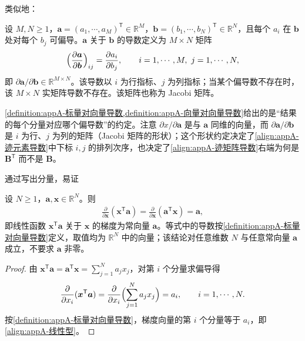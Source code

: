\documentclass[../main.tex]{subfiles}
\begin{document}
类似地：
\begin{definition}[向量关于向量的导数]\label{definition:appA-向量对向量导数}
设 $M,N\geqslant1$，$\bm{a}=(a_1,\cdots,a_M)^{\mathsf{T}}\in\mathbb{R}^{M}$，$\bm{b}=(b_1,\cdots,b_N)^{\mathsf{T}}\in\mathbb{R}^{N}$，且每个 $a_i$ 在 $\bm{b}$ 处对每个 $b_j$ 可偏导。$\bm{a}$ 关于 $\bm{b}$ 的导数定义为 $M\times N$ 矩阵
\begin{align}
  \Bigl(\frac{\partial\bm{a}}{\partial\bm{b}}\Bigr)_{ij}=\frac{\partial a_i}{\partial b_j},\qquad i=1,\cdots,M,\ j=1,\cdots,N,
  \label{align:appA-向量对向量导数}
\end{align}
即 $\partial\bm{a}/\partial\bm{b}\in\mathbb{R}^{M\times N}$。该导数以 $i$ 为行指标、$j$ 为列指标；当某个偏导数不存在时，该 $M\times N$ 实矩阵导数不存在。该矩阵也称为 Jacobi 矩阵。
\end{definition}

\begin{remark}
\cref{definition:appA-标量对向量导数,definition:appA-向量对向量导数}给出的是“结果的每个分量对应哪个偏导数”的约定。注意 $\partial x/\partial\bm{a}$ 是与 $\bm{a}$ 同维的向量，而 $\partial\bm{a}/\partial\bm{b}$ 是 $i$ 为行、$j$ 为列的矩阵（Jacobi 矩阵的形状）；这个形状约定决定了\eqref{align:appA-迹元素导数}中下标 $i,j$ 的排列次序，也决定了\eqref{align:appA-迹矩阵导数}右端为何是 $\bm{B}^{\mathsf{T}}$ 而不是 $\bm{B}$。
\end{remark}

通过写出分量，易证
\begin{proposition}[线性型的导数]\label{proposition:appA-线性型导数}
设 $N\geqslant1$，$\bm{a},\bm{x}\in\mathbb{R}^{N}$。则
\begin{align}
  \frac{\partial}{\partial\bm{x}}(\bm{x}^{\mathsf{T}}\bm{a})=\frac{\partial}{\partial\bm{x}}(\bm{a}^{\mathsf{T}}\bm{x})=\bm{a},
  \label{align:appA-线性型}
\end{align}
即线性函数 $\bm{x}^{\mathsf{T}}\bm{a}$ 关于 $\bm{x}$ 的梯度为常向量 $\bm{a}$。等式中的导数按\cref{definition:appA-标量对向量导数}定义，取值均为 $\mathbb{R}^{N}$ 中的向量；该结论对任意维数 $N$ 与任意常向量 $\bm{a}$ 成立，不要求 $\bm{a}$ 非零。
\end{proposition}

\begin{proof}
由 $\bm{x}^{\mathsf{T}}\bm{a}=\bm{a}^{\mathsf{T}}\bm{x}=\sum_{j=1}^{N}a_jx_j$，对第 $i$ 个分量求偏导得
\begin{align*}
 \frac{\partial}{\partial x_i}(\bm{x}^{\mathsf{T}}\bm{a})=\frac{\partial}{\partial x_i}\Bigl(\sum_{j=1}^{N}a_jx_j\Bigr)=a_i,\qquad i=1,\cdots,N.
\end{align*}
按\cref{definition:appA-标量对向量导数}，梯度向量的第 $i$ 个分量等于 $a_i$，即\eqref{align:appA-线性型}。
\end{proof}
\end{document}
